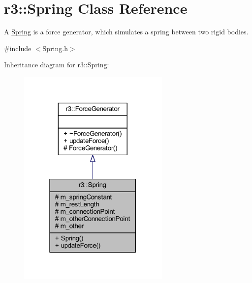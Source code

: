 \hypertarget{classr3_1_1_spring}{}\section{r3\+:\+:Spring Class Reference}
\label{classr3_1_1_spring}


A \mbox{\hyperlink{classr3_1_1_spring}{Spring}} is a force generator, which simulates a spring between two rigid bodies.  




{\ttfamily \#include $<$Spring.\+h$>$}



Inheritance diagram for r3\+:\+:Spring\+:\nopagebreak
\begin{figure}[H]
\begin{center}
\leavevmode
\includegraphics[width=211pt]{classr3_1_1_spring__inherit__graph}
\end{center}
\end{figure}


